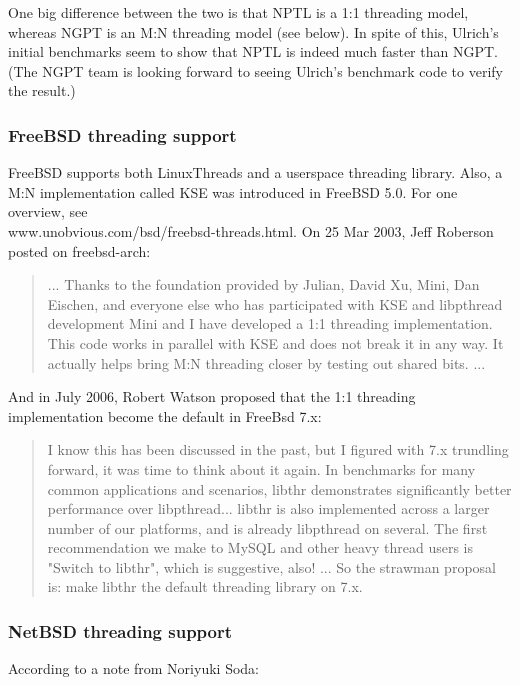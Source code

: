 \documentclass[12pt, twoside, a4paper, xetex]{report}
\begin{document}
One big difference between the two is that NPTL is a 1:1 threading model, whereas NGPT is an M:N threading model (see below). In spite of this, Ulrich's initial benchmarks seem to show that NPTL is indeed much faster than NGPT. (The NGPT team is looking forward to seeing Ulrich's benchmark code to verify the result.)

\subsubsection*{FreeBSD threading support}

FreeBSD supports both LinuxThreads and a userspace threading library. Also, a M:N implementation called KSE was introduced in FreeBSD 5.0. For one overview, see \\www.unobvious.com/bsd/freebsd-threads.html.
On 25 Mar 2003, Jeff Roberson posted on freebsd-arch:

\begin{quotation}
... Thanks to the foundation provided by Julian, David Xu, Mini, Dan Eischen, and everyone else who has participated with KSE and libpthread development Mini and I have developed a 1:1 threading implementation. This code works in parallel with KSE and does not break it in any way. It actually helps bring M:N threading closer by testing out shared bits. ...
\end{quotation}

And in July 2006, Robert Watson proposed that the 1:1 threading implementation become the default in FreeBsd 7.x:

\begin{quotation}
I know this has been discussed in the past, but I figured with 7.x trundling forward, it was time to think about it again. In benchmarks for many common applications and scenarios, libthr demonstrates significantly better performance over libpthread... libthr is also implemented across a larger number of our platforms, and is already libpthread on several. The first recommendation we make to MySQL and other heavy thread users is "Switch to libthr", which is suggestive, also! ... So the strawman proposal is: make libthr the default threading library on 7.x.
\end{quotation}

\subsubsection*{NetBSD threading support}

According to a note from Noriyuki Soda:
\end{document}
